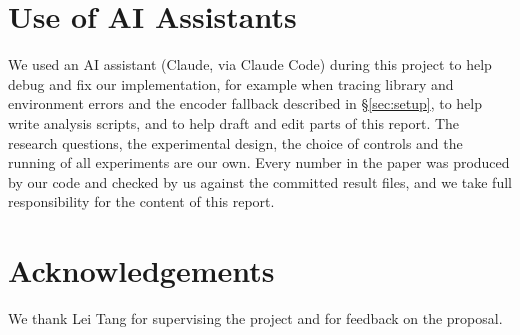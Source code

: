 \documentclass[11pt]{article}
\begin{document}
\section*{Use of AI Assistants}

We used an AI assistant (Claude, via Claude Code) during this project to help debug and fix our
implementation, for example when tracing library and environment errors and the encoder
fallback described in \S\ref{sec:setup}, to help write analysis scripts, and to help draft and
edit parts of this report. The research questions, the experimental design, the
choice of controls and the running of all experiments are our own. Every number in the paper
was produced by our code and checked by us against the committed result files, and we take
full responsibility for the content of this report.

\section*{Acknowledgements}

We thank Lei Tang for supervising the project and for feedback on the proposal.


\end{document}
